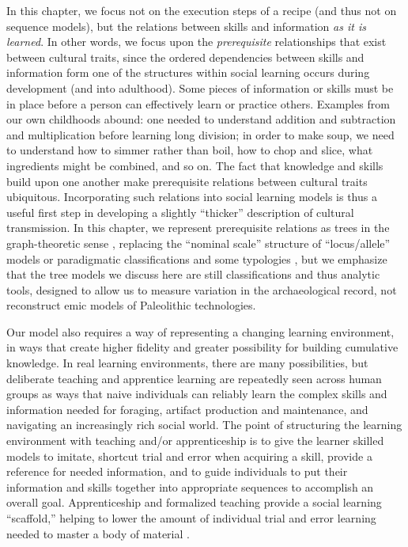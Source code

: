 \documentclass[referee,graybox,natbib]{svmult}
\begin{document}
In this chapter, we focus not on the execution steps of a recipe (and
thus not on sequence models), but the relations between skills and
information \emph{as it is learned}. In other words, we focus upon the
\emph{prerequisite} relationships that exist between cultural traits,
since the ordered dependencies between skills and information form one
of the structures within social learning occurs during development (and
into adulthood). Some pieces of information or skills must be in place
before a person can effectively learn or practice others. Examples from
our own childhoods abound: one needed to understand addition and
subtraction and multiplication before learning long division; in order
to make soup, we need to understand how to simmer rather than boil, how
to chop and slice, what ingredients might be combined, and so on. The
fact that knowledge and skills build upon one another make prerequisite
relations between cultural traits ubiquitous. Incorporating such
relations into social learning models is thus a useful first step in
developing a slightly ``thicker'' description of cultural transmission.
In this chapter, we represent prerequisite relations as trees in the
graph-theoretic sense \citep{diestel2010graph}, replacing the ``nominal
scale'' structure of ``locus/allele'' models or paradigmatic
classifications and some typologies \citep{Dunnell1971}, but we
emphasize that the tree models we discuss here are still classifications
and thus analytic tools, designed to allow us to measure variation in
the archaeological record, not reconstruct emic models of Paleolithic
technologies.

Our model also requires a way of representing a changing learning
environment, in ways that create higher fidelity and greater possibility
for building cumulative knowledge. In real learning environments, there
are many possibilities, but deliberate teaching and apprentice learning
are repeatedly seen across human groups as ways that naive individuals
can reliably learn the complex skills and information needed for
foraging, artifact production and maintenance, and navigating an
increasingly rich social world. The point of structuring the learning
environment with teaching and/or apprenticeship is to give the learner
skilled models to imitate, shortcut trial and error when acquiring a
skill, provide a reference for needed information, and to guide
individuals to put their information and skills together into
appropriate sequences to accomplish an overall goal. Apprenticeship and
formalized teaching provide a social learning ``scaffold,'' helping to
lower the amount of individual trial and error learning needed to master
a body of material \citep{wimsatt2007reproducing, wimsatt2007re}.
\end{document}
